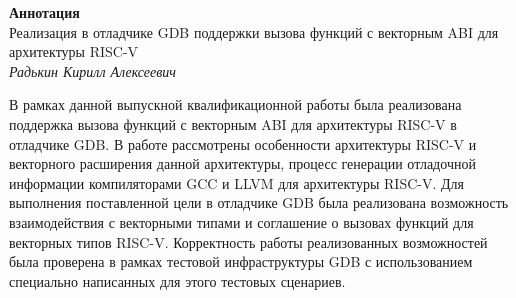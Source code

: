 \begin{center}
	\textbf{Аннотация} \\[0.3 cm]
		Реализация в отладчике GDB поддержки вызова функций с векторным ABI для архитектуры RISC-V \\
		\textit{Радькин Кирилл Алексеевич} \\[1 cm]
	\end{center}

	В рамках данной выпускной квалификационной работы была реализована поддержка вызова 
	функций с векторным ABI для архитектуры RISC-V в отладчике GDB. В работе рассмотрены
	особенности архитектуры RISC-V и векторного расширения данной архитектуры, процесс
	генерации отладочной информации компиляторами GCC и LLVM для архитектуры RISC-V.
	Для выполнения поставленной цели в отладчике GDB была реализована возможность взаимодействия
	с векторными типами и соглашение о вызовах функций для векторных типов RISC-V. Корректность работы
	реализованных возможностей была проверена в рамках тестовой инфраструктуры GDB с использованием
	специально написанных для этого тестовых сценариев.
	\\[1 cm]

	\newpage


\newpage